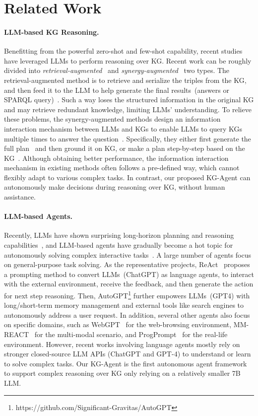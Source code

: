 \section{Related Work}
\label{related_work}
\paragraph{LLM-based KG Reasoning.}
Benefitting from the powerful zero-shot and few-shot capability, recent studies have leveraged LLMs to perform reasoning over KG.
Recent work can be roughly divided into \textit{retrieval-augmented}~\cite{TIARA} and \textit{synergy-augmented}~\cite{Gu-ACL-23} two types. The retrieval-augmented method is to retrieve and serialize the triples from the KG, and then feed it to the LLM to help generate the final results~(\eg answers or SPARQL query)~\cite{RNG-KBQA}. Such a way loses the structured information in the original KG and may retrieve redundant knowledge, limiting LLMs' understanding. To relieve these problems, the synergy-augmented methods design an information interaction mechanism between LLMs and KGs to enable LLMs to query KGs multiple times to answer the question~\cite{Jiang-2023-arxiv-StructGPT}. Specifically, they either first generate the full plan~\cite{Li-ICLKBQA-arXiv-23} and then ground it on KG, or make a plan step-by-step based on the KG~\cite{Luo-arxiv-23-Reasoning}. Although obtaining better performance, the information interaction mechanism in existing methods often follows a pre-defined way, which cannot flexibly adapt to various complex tasks. In contrast, our proposed KG-Agent can autonomously make decisions during reasoning over KG, without human assistance.

\paragraph{LLM-based Agents.}
Recently, LLMs have shown surprising long-horizon planning and reasoning capabilities~\cite{Reflexion, MemoryBank}, and LLM-based agents have gradually become a hot topic for autonomously solving complex interactive tasks~\cite{agent-survey}.
A large number of agents focus on general-purpose task solving. As the representative projects, ReAct~\cite{ReAct} proposes a prompting method to convert LLMs~(\eg ChatGPT) as language agents, to interact with the external environment, receive the feedback, and then generate the action for next step reasoning. Then, AutoGPT\footnote{https://github.com/Significant-Gravitas/AutoGPT} further empowers LLMs~(\ie GPT4) with long/short-term memory management and external tools like search engines to autonomously address a user request.
In addition, several other agents also focus on specific domains, such as WebGPT~\cite{WebGPT} for the web-browsing environment, MM-REACT~\cite{MM-REACT} for the multi-modal scenario, and ProgPrompt~\cite{ProgPrompt} for the real-life environment.
However, recent works involving language agents mostly rely on stronger closed-source LLM APIs (\eg ChatGPT and GPT-4) to understand or learn to solve complex tasks.
Our KG-Agent is the first autonomous agent framework to support complex reasoning over KG only relying on a relatively smaller 7B LLM.
